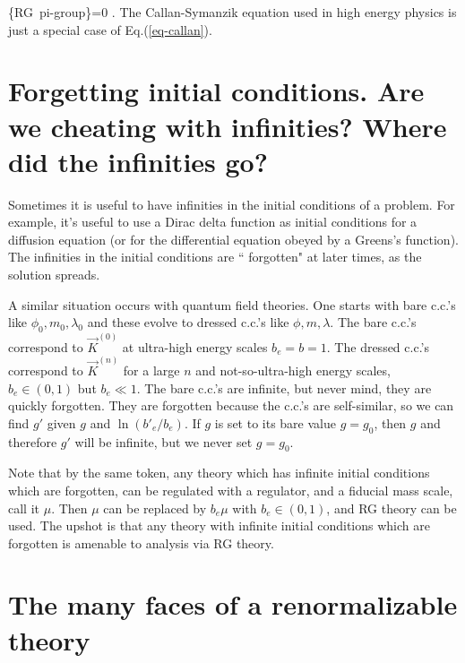 \documentclass[12pt]{article}
\begin{document}
\beq
{}
\{\mbox{\rm RG pi-group}\}=0
\;.
\label{eq-callan}
\eeq
The Callan-Symanzik equation
used in high energy physics is
just a special case of Eq.(\ref{eq-callan}).



\section{Forgetting initial conditions.
Are we cheating with infinities?
Where did the infinities go?}

Sometimes it is useful
to have infinities in the
initial conditions of a problem.
For example, it's
useful to use a Dirac delta function
as initial conditions
for a diffusion equation
(or for the differential
equation obeyed by a Greens's function).
The infinities in the initial
conditions are `` forgotten"
 at later times,
as the solution spreads.

A similar situation occurs with
quantum field theories. One starts
with bare c.c.'s like $\phi_0, m_0, \lambda_0$
and these evolve to dressed c.c.'s
like $\phi, m, \lambda$.
The bare
c.c.'s correspond to $\vec{K}^{(0)}$
at ultra-high energy scales $b_e= b=1$.
The dressed c.c.'s
 correspond to $\vec{K}^{(n)}$
for a large $n$
and not-so-ultra-high energy scales,
$b_e\in (0,1)$ but $b_e\ll 1$.
The bare c.c.'s are
infinite, but never mind, they are
quickly forgotten.
They are forgotten
because the c.c.'s are self-similar,
so we can find $g'$ given
$g$ and $\ln(b'_e/b_e)$.
If $g$ is set
to its bare value $g=g_0$,
then $g$ and therefore $g'$
will be infinite, but
we never set $g=g_0$.

Note that by the same
token, any theory which
has infinite initial conditions
which are forgotten,
can be regulated with a regulator,
and a fiducial mass scale, call it $\mu$. Then
$\mu$ can be replaced
by $b_e\mu$ with $b_e\in(0,1)$,
and RG theory can be used.
The upshot is that any
theory with infinite initial
conditions which are forgotten
is amenable to analysis
via RG theory.




\section{The many faces of a renormalizable theory}
\end{document}
